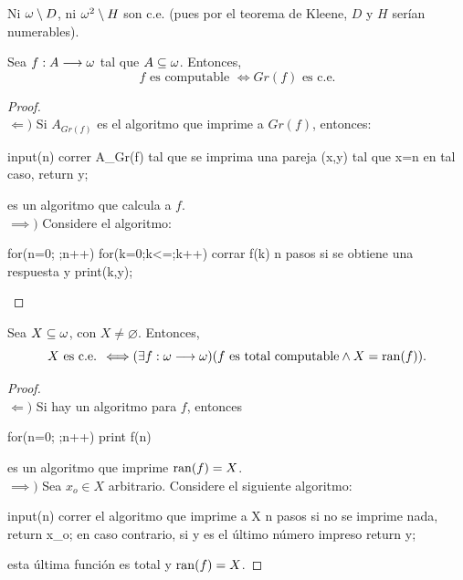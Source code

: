 \begin{obs}
    Ni $\omega\setminus D$, ni $\omega^2\setminus H$ son c.e. (pues por el teorema de Kleene, $D$ y $H$ serían numerables).
\end{obs}
\begin{thm}
    Sea $f:A\longrightarrow\omega$ tal que $A\subseteq\omega$. Entonces,
    \[f\text{ es computable }\Longleftrightarrow Gr(f)\text{ es c.e.}\]
\end{thm}
\begin{proof}\hspace{1cm}\\
    $\Longleftarrow)$ Si $A_{Gr(f)}$ es el algoritmo que imprime a $Gr(f)$, entonces:
    \begin{center}
    \begin{pseudocodigo}[0.9\linewidth]
        input(n)
        correr A_{Gr(f)} tal que se imprima una pareja (x,y) tal que x=n
        en tal caso, return y;
    \end{pseudocodigo}
    \end{center}
    es un algoritmo que calcula a $f$.\\
    $\implies)$ Considere el algoritmo:
    \begin{center}
    \begin{pseudocodigo}
        for(n=0; ;n++)
            for(k=0;k<=;k++)
                corrar f(k) n pasos
                si se obtiene una respuesta y
                    print(k,y);
    \end{pseudocodigo}
    \end{center}
\end{proof}
\begin{thm}
    Sea $X\subseteq\omega$, con $X\neq\varnothing$. Entonces,
    \[X\text{ es c.e. }\Longleftrightarrow (\exists f:\omega\longrightarrow\omega)(f\text{ es total computable}\land X=\operatorname{ran}(f)).\]
\end{thm}
\begin{proof}\hspace{1cm}\\
    $\Longleftarrow)$ Si hay un algoritmo para $f$, entonces
    \begin{center}
    \begin{pseudocodigo}
        for(n=0; ;n++)
            print f(n)
    \end{pseudocodigo}
    \end{center}
    es un algoritmo que imprime $\operatorname{ran}(f)=X$.\\
    $\implies)$ Sea $x_o\in X$ arbitrario. Considere el siguiente algoritmo:
    \begin{center}
    \begin{pseudocodigo}
        input(n)
        correr el algoritmo que imprime a X n pasos
            si no se imprime nada, return x_o;
            en caso contrario, si y es el último número impreso
            return y;
    \end{pseudocodigo}
    \end{center}
    esta última función es total y $\operatorname{ran}(f)=X$.
\end{proof}